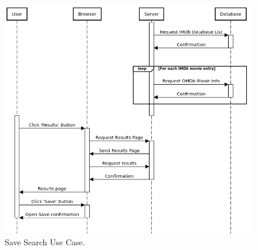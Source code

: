 \documentclass{article}
\begin{document}
\begin{figure}[H]
\includegraphics[width=\columnwidth]{res/sequence_diagram4.png}
\caption{Save Search Use Case.}
\end{figure}
\newpage
\end{document}
